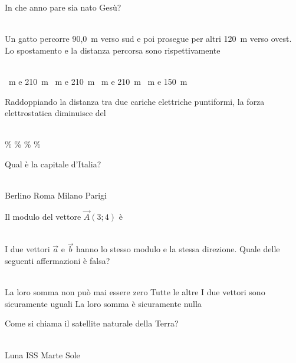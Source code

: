 \documentclass[a4paper,11pt]{exam}
\begin{document}
\begin{questions}
    
\question In che anno pare sia nato Gesù?\\\
\begin{oneparchoices}
\end{oneparchoices}

    
\question Un gatto percorre 90,0~m verso sud e poi prosegue per altri 120~m verso ovest. Lo spostamento e la distanza percorsa sono rispettivamente\\\
\begin{oneparchoices}
  \choice 30~m e 210~m
  ~m e 210~m
  ~m e 210~m
  \choice 210~m e 150~m
\end{oneparchoices}

    
\question Raddoppiando la distanza tra due cariche elettriche puntiformi, la forza elettrostatica diminuisce del\\\
\begin{oneparchoices}
  \choice 25\%
  \choice 90\%
  \%
  \%
\end{oneparchoices}

    
\question Qual è la capitale d’Italia?\\\
\begin{oneparchoices}
  \choice Berlino
  \choice Roma
  \choice Milano
  \choice Parigi
\end{oneparchoices}

    
\question Il modulo del vettore $\vec{A}(3;4)$ è\\\
\begin{oneparchoices}
  \choice 8
  \choice 5
  \choice 12
\end{oneparchoices}

    
\question I due vettori $\vec{a}$ e $\vec{b}$ hanno lo stesso modulo e la stessa direzione. Quale delle seguenti affermazioni è falsa?\\\
\begin{oneparchoices}
  \choice La loro somma non può mai essere zero
  \choice Tutte le altre
  \choice I due vettori sono sicuramente uguali
  \choice La loro somma è sicuramente nulla
\end{oneparchoices}

    
\question Come si chiama il satellite naturale della Terra?\\\
\begin{oneparchoices}
  \choice Luna
  \choice ISS
  \choice Marte
  \choice Sole
\end{oneparchoices}


\end{questions}
\end{document}
